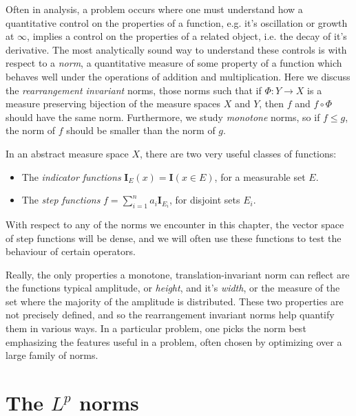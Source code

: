 Often in analysis, a problem occurs where one must understand how a quantitative control on the properties of a function, e.g. it's oscillation or growth at $\infty$, implies a control on the properties of a related object, i.e. the decay of it's derivative. The most analytically sound way to understand these controls is with respect to a {\it norm}, a quantitative measure of some property of a function which behaves well under the operations of addition and multiplication. Here we discuss the {\it rearrangement invariant} norms, those norms such that if $\Phi: Y \to X$ is a measure preserving bijection of the measure spaces $X$ and $Y$, then $f$ and $f \circ \Phi$ should have the same norm. Furthermore, we study {\it monotone} norms, so if $f \leq g$, the norm of $f$ should be smaller than the norm of $g$.

In an abstract measure space $X$, there are two very useful classes of functions:
%
\begin{itemize}
    \item The \emph{indicator functions} $\mathbf{I}_E(x) = \mathbf{I}(x \in E)$, for a measurable set $E$.
    \item The \emph{step functions} $f = \sum_{i = 1}^n a_i \mathbf{I}_{E_i}$, for disjoint sets $E_i$.
\end{itemize}
%
With respect to any of the norms we encounter in this chapter, the vector space of step functions will be dense, and we will often use these functions to test the behaviour of certain operators.

Really, the only properties a monotone, translation-invariant norm can reflect are the functions typical amplitude, or {\it height}, and it's {\it width}, or the measure of the set where the majority of the amplitude is distributed. These two properties are not precisely defined, and so the rearrangement invariant norms help quantify them in various ways. In a particular problem, one picks the norm best emphasizing the features useful in a problem, often chosen by optimizing over a large family of norms.

\section{The $L^p$ norms}

